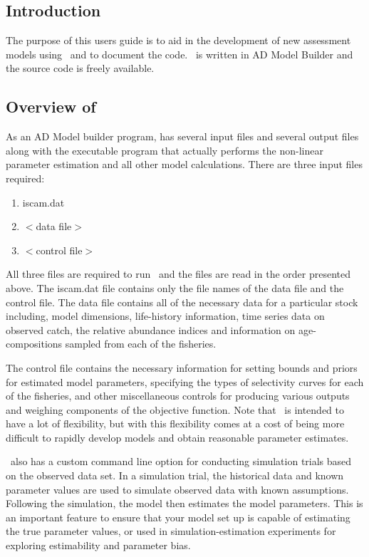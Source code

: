 \setlength{\columnseprule}{1pt}
\setlength{\columnsep}{20pt}

\begin{multicols}{2}
\section{Introduction}
The purpose of this users guide is to aid in the development of new assessment models using \iscam\ and to document the code. \iscam\ is written in AD Model Builder and the source code is freely available.

\subsection{Overview of \iscam}
As an AD Model builder program, \iscam has several input files and several output files along with the executable program that actually performs the non-linear parameter estimation and all other model calculations.  There are three input files required:
\begin{enumerate}
	\item iscam.dat
	\item $<$data file$>$
	\item $<$control file$>$
\end{enumerate}
 All three files are required to run \iscam\, and the files are read in the order presented above.  The iscam.dat file contains only the file names of the data file and the control file.  The data file contains all of the necessary data for a particular stock including, model dimensions, life-history information, time series data on observed catch, the relative abundance indices and information on age-compositions sampled from each of the fisheries.
 
 The control file contains the necessary information for setting bounds and priors for estimated model parameters, specifying the types of selectivity curves for each of the fisheries, and other miscellaneous controls for producing various outputs and weighing components of the objective function.  Note that \iscam\ is intended to have a lot of flexibility, but with this flexibility comes at a cost of being more difficult to rapidly develop models and obtain reasonable parameter estimates.
 
 \iscam\ also has a custom command line option for conducting simulation trials based on the observed data set. In a simulation trial, the historical data and known parameter values are used to simulate observed data with known assumptions. Following the simulation, the model then estimates the model parameters.   This is an important feature to ensure that your model set up is capable of estimating the true parameter values, or used in simulation-estimation experiments for exploring estimability and parameter bias.
 

\end{multicols}
